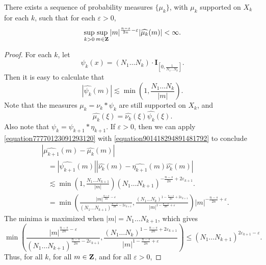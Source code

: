 \begin{lemma}
    There exists a sequence of probability measures $\{ \mu_k \}$, with $\mu_k$ supported on $X_k$ for each $k$, such that for each $\varepsilon > 0$,
    \[ \sup_{k > 0} \sup_{m \in \operatorname{\mathbf{Z}}} |m|^{\frac{n-s}{2n} - \varepsilon} |\widehat{\mu_k}(m)| < \infty. \]
\end{lemma}
\begin{proof}
    For each $k$, let
    \[ \psi_k(x) = (N_1 \dots N_k) \cdot \mathbf{I}_{\left[ 0, \frac{1}{N_1 \dots N_k} \right]}. \]
    Then it is easy to calculate that
    \begin{equation} \label{equation901418294891481792}
        |\widehat{\psi_k}(m)| \lesssim \min \left( 1, \frac{N_1 \dots N_k}{|m|} \right).
    \end{equation}
    Note that the measures $\mu_k = \nu_k * \psi_k$ are still supported on $X_k$, and
    \[ \widehat{\mu_k}(\xi) = \widehat{\nu_k}(\xi) \widehat{\psi_k}(\xi). \]
    Also note that $\psi_k = \psi_{k+1} * \eta_{k+1}$. If $\varepsilon > 0$, then we can apply \eqref{equation77770123091293120} with \eqref{equation901418294891481792} to conclude
    \begin{equation} \label{equation6892489214781278}
    \begin{split}
        &|\widehat{\mu_{k+1}}(m) - \widehat{\mu_k}(m)|\\
        &\ \ \ \ = |\widehat{\psi_{k+1}}(m)| |\widehat{\nu_k}(m) - \widehat{\eta_{k+1}}(m) \widehat{\nu_k}(m)|\\
        &\ \ \ \ \lesssim \min \left( 1, \frac{N_1 \dots N_{k+1}}{|m|} \right) (N_1 \dots N_{k+1})^{-\frac{n-s}{2n} + 2\varepsilon_{k+1}}.\\
        &\ \ \ \ = \min \left( \frac{|m|^{\frac{n-s}{2n} - \varepsilon}}{(N_1 \dots N_{k+1})^{\frac{n-s}{2n} - 2\varepsilon_{k+1}}}, \frac{(N_1 \dots N_k)^{1 - \frac{n-s}{2n} + 2\varepsilon_{k+1}}}{|m|^{1 - \frac{n-s}{2n} + \varepsilon}} \right) |m|^{- \frac{n-s}{2n} + \varepsilon}.
    \end{split}
    \end{equation}
    The minima is maximized when $|m| = N_1 \dots N_{k+1}$, which gives
    \[ \min \left( \frac{|m|^{\frac{n-s}{2n} - \varepsilon}}{(N_1 \dots N_{k+1})^{\frac{n-s}{2n} - 2\varepsilon_{k+1}}}, \frac{(N_1 \dots N_k)^{1 - \frac{n-s}{2n} + 2\varepsilon_{k+1}}}{|m|^{1 - \frac{n-s}{2n} + \varepsilon}} \right) \leq (N_1 \dots N_{k+1})^{2\varepsilon_{k+1} - \varepsilon}. \]
    Thus, for all $k$, for all $m \in \operatorname{\mathbf{Z}}$, and for all $\varepsilon > 0$,

\end{proof}
